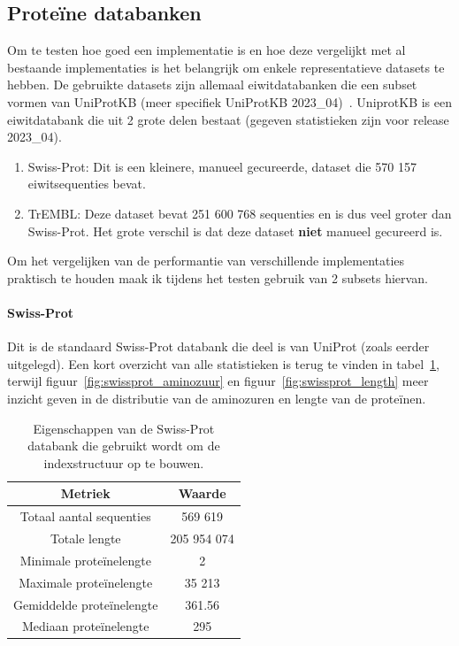 \documentclass[11pt,dutch,faculty=we,layout=titlefont,underline=false,titleUppercase=true,titleUnderline=true]{ugent2016-report}
\begin{document}
    \subsection{Proteïne databanken}\label{subsec:proteine-databanken}
    Om te testen hoe goed een implementatie is en hoe deze vergelijkt met al bestaande implementaties is het belangrijk om enkele representatieve datasets te hebben.
    De gebruikte datasets zijn allemaal eiwitdatabanken die een subset vormen van UniProtKB (meer specifiek UniProtKB 2023\_04)~\cite{UniprotKB}.
    UniprotKB is een eiwitdatabank die uit 2 grote delen bestaat (gegeven statistieken zijn voor release 2023\_04).
    \begin{enumerate}
        \item Swiss-Prot: Dit is een kleinere, manueel gecureerde, dataset die 570 157 eiwitsequenties bevat.
        \item TrEMBL: Deze dataset bevat 251 600 768 sequenties en is dus veel groter dan Swiss-Prot.
        Het grote verschil is dat deze dataset \textbf{niet} manueel gecureerd is.
    \end{enumerate}
    Om het vergelijken van de performantie van verschillende implementaties praktisch te houden maak ik tijdens het testen gebruik van 2 subsets hiervan.

    \paragraph{Swiss-Prot} Dit is de standaard Swiss-Prot databank die deel is van UniProt (zoals eerder uitgelegd).
    Een kort overzicht van alle statistieken is terug te vinden in tabel~\ref{tab:swissprot_eigenschappen}, terwijl figuur~\ref{fig:swissprot_aminozuur} en figuur~\ref{fig:swissprot_length} meer inzicht geven in de distributie van de aminozuren en lengte van de proteïnen.

    \begin{table}[h!]
        \centering
        \begin{tabular}{c c}
            Metriek                   & Waarde      \\
            \hline\hline
            Totaal aantal sequenties  & 569 619     \\
            Totale lengte             & 205 954 074 \\
            Minimale proteïnelengte   & 2           \\
            Maximale proteïnelengte   & 35 213      \\
            Gemiddelde proteïnelengte & 361.56      \\
            Mediaan proteïnelengte    & 295         \\
            \hline
        \end{tabular}
        \caption{Eigenschappen van de Swiss-Prot databank die gebruikt wordt om de indexstructuur op te bouwen.}
        \label{tab:swissprot_eigenschappen}
    \end{table}
\end{document}
